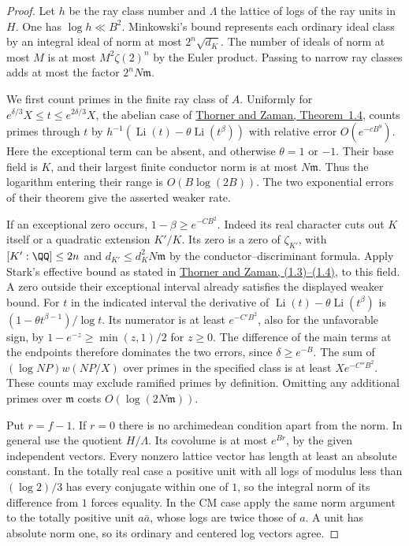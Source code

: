 \documentclass[a4paper,11pt]{article}
\theoremstyle{definition}
\theoremstyle{remark}
\numberwithin{equation}{section}
\begin{document}
\begin{proof}
Let \(h\) be the ray class number and \(\Lambda\) the lattice of
logs of the ray units in \(H\). One has \(\log h\ll B^2\).
Minkowski's bound represents each ordinary ideal class by an
integral ideal of norm at most \(2^n\sqrt{d_K}\). The number of
ideals of norm at most \(M\) is at most \(M^2\zeta(2)^n\) by the
Euler product. Passing to narrow ray classes adds at most the
factor \(2^n N\mathfrak m\).

We first count primes in the finite ray class of \(A\). Uniformly
for \(e^{\delta/3}X\le t\le e^{2\delta/3}X\), the abelian case of
\href{https://arxiv.org/pdf/1803.02823}{Thorner and Zaman, Theorem~1.4},
counts primes through \(t\) by
\(h^{-1}(\operatorname{Li}(t)-\theta\operatorname{Li}(t^\beta))\)
with relative error \(O(e^{-c B^9})\). Here the exceptional term
can be absent, and otherwise \(\theta=1\) or \(-1\). Their base
field is \(K\), and their largest finite conductor norm is at most
\(N\mathfrak m\). Thus the logarithm entering their range is
\(O(B\log(2B))\). The two exponential errors of their theorem
give the asserted weaker rate.

If an exceptional zero occurs, \(1-\beta\ge e^{-C B^2}\).
Indeed its real character cuts out \(K\) itself or a quadratic
extension \(K'/K\). Its zero is a zero of \(\zeta_{K'}\), with
\([K':\QQ]\le2n\) and \(d_{K'}\le d_K^2 N\mathfrak m\) by the
conductor--discriminant formula. Apply Stark's effective bound
as stated in \href{https://arxiv.org/pdf/1803.02823}{Thorner
and Zaman, (1.3)--(1.4)}, to this field. A zero outside their
exceptional interval already satisfies the displayed weaker bound.
For \(t\) in the indicated interval the derivative of
\(\operatorname{Li}(t)-\theta\operatorname{Li}(t^\beta)\)
is \((1-\theta t^{\beta-1})/\log t\). Its numerator is at least
\(e^{-C' B^2}\), also for the unfavorable sign, by
\(1-e^{-z}\ge\min(z,1)/2\) for \(z\ge0\).
The difference of the main terms at the endpoints therefore
dominates the two errors, since \(\delta\ge e^{-B}\).
The sum of \((\log NP)w(NP/X)\) over primes in the specified
class is at least \(X e^{-C''B^2}\). These counts may exclude
ramified primes by definition. Omitting any additional primes
over \(\mathfrak m\) costs \(O(\log(2N\mathfrak m))\).

Put \(r=f-1\). If \(r=0\) there is no archimedean condition apart
from the norm. In general use the quotient \(H/\Lambda\). Its
covolume is at most \(e^{Br}\), by the given independent vectors.
Every nonzero lattice vector has length at least an absolute
constant. In the totally real case a positive unit with all logs
of modulus less than \((\log 2)/3\) has every conjugate within
one of \(1\), so the integral norm of its difference from \(1\)
forces equality. In the CM case apply the same norm argument to
the totally positive unit \(a\bar a\), whose logs are twice
those of \(a\). A unit has absolute norm one, so its ordinary
and centered log vectors agree.


\end{proof}
\end{document}
